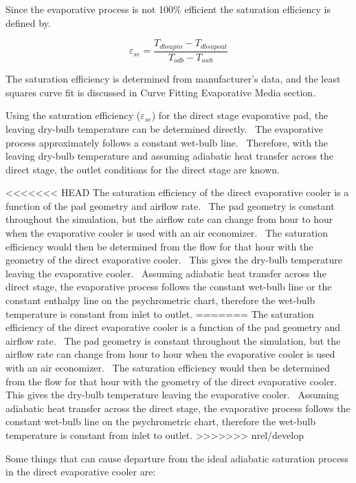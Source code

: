 Since the evaporative process is not 100\% efficient the saturation efficiency is defined by.

\begin{equation}
{\varepsilon_{se}} = \frac{{{T_{dbsupin}} - {T_{dbsupout}}}}{{{T_{odb}} - {T_{owb}}}}
\end{equation}

The saturation efficiency is determined from manufacturer's data, and the least squares curve fit is discussed in Curve Fitting Evaporative Media section.

Using the saturation efficiency (\(\varepsilon_{se}\)) for the direct stage evaporative pad, the leaving dry-bulb temperature can be determined directly.~ The evaporative process approximately follows a constant wet-bulb line.~ Therefore, with the leaving dry-bulb temperature and assuming adiabatic heat transfer across the direct stage, the outlet conditions for the direct stage are known.

<<<<<<< HEAD
The saturation efficiency of the direct evaporative cooler is a function of the pad geometry and airflow rate.~ The pad geometry is constant throughout the simulation, but the airflow rate can change from hour to hour when the evaporative cooler is used with an air economizer.~ The saturation efficiency would then be determined from the flow for that hour with the geometry of the direct evaporative cooler.~ This gives the dry-bulb temperature leaving the evaporative cooler.~ Assuming adiabatic heat transfer across the direct stage, the evaporative process follows the constant wet-bulb line or the constant enthalpy line on the psychrometric chart, therefore the wet-bulb temperature is constant from inlet to outlet.
=======
The saturation efficiency of the direct evaporative cooler is a function of the pad geometry and airflow rate.~ The pad geometry is constant throughout the simulation, but the airflow rate can change from hour to hour when the evaporative cooler is used with an air economizer.~ The saturation efficiency would then be determined from the flow for that hour with the geometry of the direct evaporative cooler.~ This gives the dry-bulb temperature leaving the evaporative cooler.~ Assuming adiabatic heat transfer across the direct stage, the evaporative process follows the constant wet-bulb line on the psychrometric chart, therefore the wet-bulb temperature is constant from inlet to outlet.
>>>>>>> nrel/develop

Some things that can cause departure from the ideal adiabatic saturation process in the direct evaporative cooler are:

